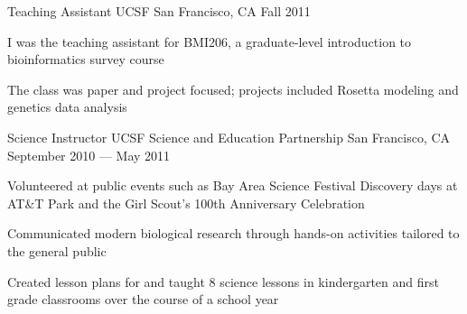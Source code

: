 \begin{cventries}
  \cventry
  {Teaching Assistant} %
  {UCSF} %
  {San Francisco, CA} %
  {Fall 2011} %
  {
    \begin{cvitems} %
    \item I was the teaching assistant for BMI206, a graduate-level introduction to bioinformatics survey course
    \item The class was paper and project focused; projects included Rosetta modeling and genetics data analysis
    \end{cvitems}
  }

  \cventry
  {Science Instructor} %
  {UCSF Science and Education Partnership} %
  {San Francisco, CA} %
  {September 2010 --- May 2011} %
  {
    \begin{cvitems} %
    \item Volunteered at public events such as Bay Area Science Festival Discovery days at AT\&T Park and the Girl Scout's 100th Anniversary Celebration
    \item Communicated modern biological research through hands-on activities tailored to the general public
    \item Created lesson plans for and taught 8 science lessons in kindergarten and first grade classrooms over the course of a school year
    \end{cvitems}
  }

\end{cventries}
